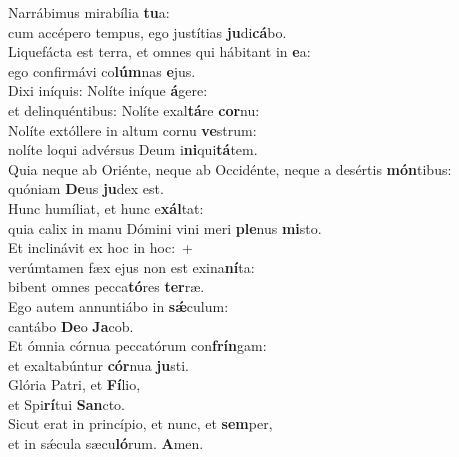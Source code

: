 \evenverse Narrábimus mirabília \textbf{tu}a:~\*\\
\evenverse cum accépero tempus, ego justítias \textbf{ju}di\textbf{cá}bo.\\
\oddverse Liquefácta est terra, et omnes qui hábitant in \textbf{e}a:~\*\\
\oddverse ego confirmávi co\textbf{lúm}nas \textbf{e}jus.\\
\evenverse Dixi iníquis: Nolíte iníque \textbf{á}gere:~\*\\
\evenverse et delinquéntibus: Nolíte exal\textbf{tá}re \textbf{cor}nu:\\
\oddverse Nolíte extóllere in altum cornu \textbf{ve}strum:~\*\\
\oddverse nolíte loqui advérsus Deum i\textbf{ni}qui\textbf{tá}tem.\\
\evenverse Quia neque ab Oriénte, neque ab Occidénte, neque a desértis \textbf{món}tibus:~\*\\
\evenverse quóniam \textbf{De}us \textbf{ju}dex est.\\
\oddverse Hunc humíliat, et hunc e\textbf{xál}tat:~\*\\
\oddverse quia calix in manu Dómini vini meri \textbf{ple}nus \textbf{mi}sto.\\
\evenverse Et inclinávit ex hoc in hoc:~+\\
\evenverse  verúmtamen fæx ejus non est exina\textbf{ní}ta:~\*\\
\evenverse bibent omnes pecca\textbf{tó}res \textbf{ter}ræ.\\
\oddverse Ego autem annuntiábo in \textbf{sǽ}culum:~\*\\
\oddverse cantábo \textbf{De}o \textbf{Ja}cob.\\
\evenverse Et ómnia córnua peccatórum con\textbf{frín}gam:~\*\\
\evenverse et exaltabúntur \textbf{cór}nua \textbf{ju}sti.\\
\oddverse Glória Patri, et \textbf{Fí}lio,~\*\\
\oddverse et Spi\textbf{rí}tui \textbf{San}cto.\\
\evenverse Sicut erat in princípio, et nunc, et \textbf{sem}per,~\*\\
\evenverse et in sǽcula sæcu\textbf{ló}rum. \textbf{A}men.\\

